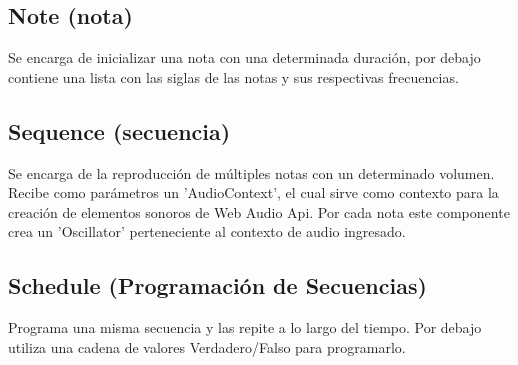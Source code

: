 \subsection{Note (nota)}
Se encarga de inicializar una nota con una determinada duración,
por debajo contiene una lista con las siglas de las notas y sus respectivas
frecuencias.
\subsection{Sequence (secuencia)}
Se encarga de la reproducción de múltiples notas con un determinado
volumen. Recibe como parámetros un 'AudioContext', el cual sirve como
contexto para la creación de elementos sonoros de Web Audio Api. Por
cada nota este componente crea un 'Oscillator' perteneciente al
contexto de audio ingresado.
\subsection{Schedule (Programación de Secuencias)}
Programa una misma secuencia y las repite a lo largo del tiempo.
Por debajo utiliza una cadena de valores Verdadero/Falso para programarlo.
